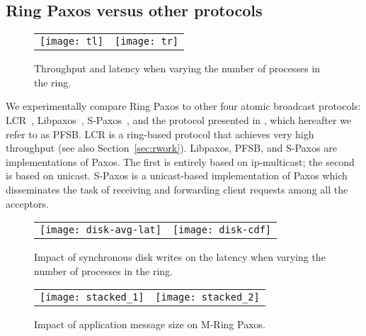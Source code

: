 \documentclass[final,3p,times,twocolumn,authoryear]{elsarticle}
\begin{document}
\subsection{Ring Paxos versus other protocols}
\label{sec:rpaxosothers}

\begin{figure*}
  \begin{center}
    \begin{tabular}{c@{}c}
      \texttt{[image: tl]} &
      \texttt{[image: tr]} \\


    \end{tabular}
\caption{Throughput and latency when varying the number of processes in the ring.}
    \label{fig:acceptors}
  \end{center}
\end{figure*}


We experimentally compare Ring Paxos to other four atomic broadcast protocols: LCR~\cite{Guerraoui2010}, 
Libpaxos~\cite{Libpaxos}, S-Paxos~\cite{spaxos}, and the protocol presented in \cite{KA08}, which hereafter we refer to as PFSB. 
LCR is a ring-based protocol that achieves very high throughput (see also Section~\ref{sec:rwork}). 
Libpaxos, PFSB, and S-Paxos are implementations of Paxos. The first is entirely based on ip-multicast; the second is based on unicast. 
S-Paxos is a unicast-based implementation of Paxos which disseminates the task of receiving and forwarding client requests among all the acceptors.

\begin{figure*}
  \begin{center}
    \begin{tabular}{c@{}c}
\texttt{[image: disk-avg-lat]} &
      \texttt{[image: disk-cdf]} \\
    \end{tabular}
    \vspace{-3mm}
    \caption{Impact of synchronous disk writes on the latency when varying the number of processes in the ring.}
\label{fig:disks}
  \end{center}
\end{figure*}

\begin{figure*}
  \begin{center}

   \begin{tabular}{c@{}c}
      \texttt{[image: stacked\_1]} &
      \texttt{[image: stacked\_2]}\\
    \end{tabular}
\caption{Impact of application message size on M-Ring Paxos.}
    \label{fig:multicast-msize}

  \end{center}
\end{figure*}
\end{document}
